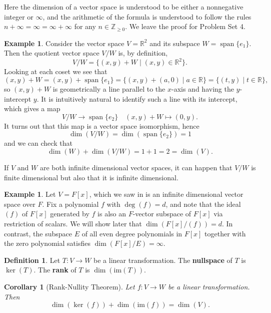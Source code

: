 \documentclass[12pt]{report}
\newtheorem{corollary}[theorem]{Corollary}
\numberwithin{equation}{section}
\numberwithin{theorem}{chapter}
\theoremstyle{definition}
\newtheorem{definition}[theorem]{Definition}
\newtheorem{example}[theorem]{Example}
\newtheorem*{basic properties}{Basic Properties}
\newtheorem*{Important Remark}{Important Remark}
\newcommand{\df}[1]{{\bf #1}\index{#1}}
\renewcommand{\ker}{\operatorname{ker}}
\DeclareMathOperator{\Span}{span}
\begin{document}
Here the dimension of a vector space is understood to be either a nonnegative integer or $\infty$, and  the arithmetic of the formula is understood to follow the rules  $n+\infty=\infty=\infty+\infty$ for any $n\in \mathbb{Z}_{\geqslant 0}$. 
We leave the proof for Problem Set 4.
 


\begin{example}
Consider the vector space $V = \mathbb{R}^2$ and its subspace $W=\Span\{e_1\}$. Then the quotient vector space $V/W$ is, by definition,
$$V/W=\{(x,y)+W \mid (x,y)\in \mathbb{R}^2\}.$$
Looking at each coset we see that
$$(x,y)+W=(x,y)+\Span\{e_1\}=\{(x,y)+(a,0)\mid a\in \mathbb{R}\}=\{(t,y)\mid t\in \mathbb{R}\},$$
so $(x,y)+W$ is geometrically a line parallel to the $x$-axis and having the $y$-intercept $y$. It is intuitively natural to identify such a line with its intercept, which gives a map
$$V/W\to \Span\{e_2\} \quad (x,y)+W \mapsto (0,y).$$
It turns out that this map is a vector space isomorphism, hence 
$$\dim(V/W) = \dim(\Span\{e_2\}) = 1$$ 
and we can check that 
$$\dim(W) + \dim(V/W) = 1+1 = 2 = \dim(V).$$
\end{example}


 
If $V$ and $W$ are both infinite dimensional vector spaces, it can happen that $V/W$ is finite dimensional but also that it is infinite dimensional.
 
\begin{example}
Let $V=F[x]$, which we saw in  is an infinite dimensional vector space over $F$. Fix a polynomial $f$ with $\deg(f)=d$, and note that the ideal $(f)$ of $F[x]$ generated by $f$ is also an $F$-vector subspace of $F[x]$ via restriction of scalars. We will show later that $\dim(F[x]/(f))=d$. In contrast, the subspace $E$ of all even degree polynomials in $F[x]$ together with the zero polynomial satisfies $\dim(F[x]/E)=\infty$.
\end{example}
 
 
 
\begin{definition} 
Let $T\!: V \to W$ be a linear transformation. The \df{nullspace} of $T$ is $\ker(T)$. The \df{rank} of $T$ is $\dim(\mathrm{im}(T))$. 
 \end{definition}

 
 \begin{corollary}[Rank-Nullity Theorem]\label{rank nulity}
 Let $f\!: V \to W$ be a linear transformation. Then 
 $$\dim(\ker(f)) + \dim(\mathrm{im}(f)) = \dim(V).$$
 \end{corollary} 
 
\end{document}
